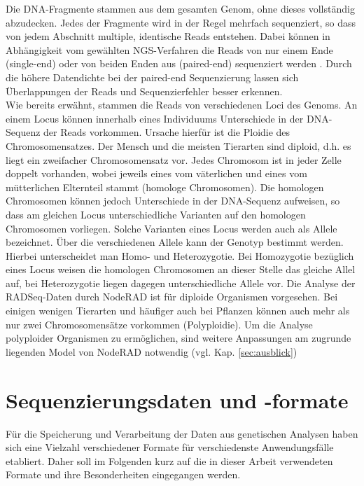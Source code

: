 Die DNA-Fragmente stammen aus dem gesamten Genom, ohne dieses vollständig abzudecken. Jedes der Fragmente wird in der Regel mehrfach sequenziert, so dass von jedem Abschnitt multiple, identische Reads entstehen. Dabei können in Abhängigkeit vom gewählten NGS-Verfahren die Reads von nur einem Ende (single-end) oder von beiden Enden aus (paired-end) sequenziert werden \cite{mardis_2017, rizzo_2012, ambardar_2016}. Durch die höhere Datendichte bei der paired-end Sequenzierung lassen sich Überlappungen der Reads und Sequenzierfehler besser erkennen. \\

Wie bereits erwähnt, stammen die Reads von verschiedenen Loci des Genoms. An einem Locus können innerhalb eines Individuums Unterschiede in der DNA-Sequenz der Reads vorkommen. Ursache hierfür ist die Ploidie des Chromosomensatzes. Der Mensch und die meisten Tierarten sind diploid, d.h. es liegt ein zweifacher Chromosomensatz vor. Jedes Chromosom ist in jeder Zelle doppelt vorhanden, wobei jeweils eines vom väterlichen und eines vom mütterlichen Elternteil stammt (homologe Chromosomen). Die homologen Chromosomen können jedoch Unterschiede in der DNA-Sequenz aufweisen, so dass am gleichen Locus unterschiedliche Varianten auf den homologen Chromosomen vorliegen. Solche Varianten eines Locus werden auch als Allele bezeichnet. Über die verschiedenen Allele kann der Genotyp bestimmt werden. Hierbei unterscheidet man Homo- und Heterozygotie. Bei  Homozygotie bezüglich eines Locus weisen die homologen Chromosomen an dieser Stelle das gleiche Allel auf, bei Heterozygotie liegen dagegen unterschiedliche Allele vor. Die Analyse der RADSeq-Daten durch NodeRAD ist für diploide Organismen vorgesehen. Bei einigen wenigen Tierarten und häufiger auch bei Pflanzen können auch mehr als nur zwei Chromosomensätze vorkommen (Polyploidie). Um die Analyse polyploider Organismen zu ermöglichen, sind weitere Anpassungen am zugrunde liegenden Model von NodeRAD notwendig (vgl. Kap. \ref{sec:ausblick})

\section{Sequenzierungsdaten und -formate}

Für die Speicherung und Verarbeitung der Daten aus genetischen Analysen haben sich eine Vielzahl verschiedener Formate für verschiedenste Anwendungsfälle etabliert. Daher soll im Folgenden kurz auf die in dieser Arbeit verwendeten Formate und ihre Besonderheiten eingegangen werden.

